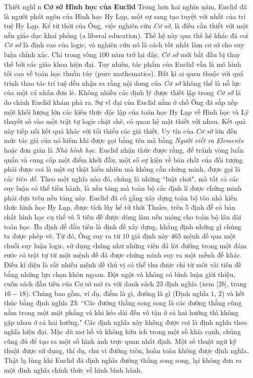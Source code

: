\begin{multicols}{2}
	\vskip 0.1cm
	Thiết nghĩ n
	\vskip 0.1cm
	\textbf{\color{lichsutoanhoc}Cơ sở Hình học của Euclid}
	\vskip 0.1cm
	Trong hơn hai nghìn năm, Euclid đã là người phát ngôn của Hình học Hy Lạp, một sự sang tạo tuyệt vời nhất của trí tuệ Hy Lạp. Kể từ thời của Ông, việc nghiên cứu \textit{Cơ sở}, là điều cần thiết với một nền giáo dục khai phóng (a liberal education). Thế hệ này qua thế hệ khác đã coi \textit{Cơ sở} là đỉnh cao của logic, và nghiên cứu nó là cách tốt nhất làm cơ sở cho suy luận chính xác.  Chỉ trong vòng $100$ năm trở lại đây, \textit{Cơ sở} mới bắt đầu bị thay thế bởi các giáo khoa hiện đại. Tuy nhiên, tác phẩm của Euclid vẫn là mô hình tối cao về toán học thuần túy (pure mathematics).
	\vskip 0.1cm
	Bất kì ai quen thuộc với quá trình thao tác trí tuệ đều nhận ra rằng nội dung của \textit{Cơ sở} không thể là nỗ lực của một cá nhân đơn lẻ. Không nhiều các định lý được thiết lập trong \textit{Cơ sở} là do chính Euclid khám phá ra. Sự vĩ đại của Euclid nằm ở chỗ Ông đã sắp xếp một khối lượng lớn các kiến thức độc lập của toán học Hy Lạp về Hình học và Lý thuyết số vào một trật tự logic chặt chẽ, có quan hệ mật thiết với nhau. Kết quả này tiếp nối kết quả khác với tối thiểu các giả thiết. Uy tín của \textit{Cơ sở} lớn đến mức tác giả của nó hiếm khi được gọi bằng tên mà bằng \textit{Người viết ra Elements} hoặc đơn giản là \textit{Nhà hình học}.
	\vskip 0.1cm 
	Euclid nhận thức được rằng, để tránh vòng luẩn quẩn và cung cấp một điểm khởi đầu, một số sự kiện về bản chất của đối tượng phải được coi là một sự thật hiển nhiên mà không cần chứng minh, được gọi là các \textit{tiên đề}. Theo một nghĩa nào đó, chúng là những ``luật chơi", mà tất cả các suy luận có thể tiến hành, là nền tảng mà toàn bộ các định lí được chứng minh phải dựa trên nền tảng này.
	\vskip 0.1cm
	Euclid đã cố gắng xây dựng toàn bộ tòa nhà kiến thức hình học Hy Lạp, được tích lũy kể từ thời Thales, trên $5$ định đề có bản chất hình học cụ thể và $5$ tiên đề được dùng làm nền móng cho toàn bộ lâu đài toán học. Ba định đề đầu tiên là định đề xây dựng, khẳng định những gì chúng ta được phép vẽ. Từ đó, Ông suy ra từ $10$ giả định này $465$ mệnh đề qua một chuỗi suy luận logic, sử dụng chúng như những viên đá lót đường trong một đám rước có trật tự từ một mệnh đề đã được chứng minh suy ra một mềnh đề khác. Điều kì diệu là rất nhiều mệnh đề thú vị có thể thu được chỉ từ môt vài tiên đề bằng những lựa chọn khôn ngoan. 
	\vskip 0.1cm
	Đột ngột và không có bình luận giới thiệu, cuốn sách đầu tiên của Cơ sở mở ra với danh sách $23$ định nghĩa (xem [$2b$], trang $16-18$). Chúng bao gồm, ví dụ, điểm là gì, đường là gì (Định nghĩa $1$, $2$) và kết thúc bằng định nghĩa $23$: ``Các đường thẳng song song là các đường thằng cùng nằm trong một mặt phẳng và khi kéo dài đến vô tận ở cả hai hướng thì không gặp nhau ở cả hai hướng." Các định nghĩa này không được coi là định nghĩa theo nghĩa hiện đại. Mặc dù mơ hồ và không hữu ích trong một số khía cạnh, chúng cũng đủ để tạo ra một số hình ảnh trực quan nhất định. Một số thuật ngữ kỹ thuật được sử dụng, thí dụ, chu vi đường tròn, hoàn toàn không được định nghĩa. Thật lạ lùng khi Euclid đã định nghĩa đường thẳng song song, lại không đưa ra một đinh nghĩa chính thức về hình bình hành.

\end{multicols}
